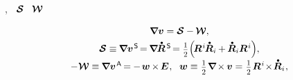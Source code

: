 \noindent {},  ~${\bm{\mathcal{S}}}$  ~${\vorticitytensor}$

\nopagebreak\begin{equation}
\begin{array}{c}
\boldnabla \bm{v} = \strainratetensor - \hspace{-0.1ex} \vorticitytensor
,
\\[.333em]
%
\strainratetensor \equiv \hspace{-0.12ex} \boldnabla {\bm{v}}^{\hspace{.2ex}\mathsf{S}} \hspace{-0.32ex}
=  \hspace{-0.2ex} \boldnabla \hspace{-0.16ex} \mathdotabove{\bm{R}}^{\hspace{.3ex}\mathsf{S}} \hspace{-0.32ex}
= \smalldisplaystyleonehalf \hspace{-0.33ex} \left( \hspace{-0.3ex} \bm{R}^{\hspace{.1ex}i} \hspace{-0.2ex} \mathdotabove{\bm{R}}_i \hspace{-0.1ex} + \hspace{-0.1ex} \mathdotabove{\bm{R}}_i \bm{R}^{\hspace{.1ex}i} \right)
\hspace{-0.44ex} ,
\\[.44em]
%
- \hspace{.1ex} \vorticitytensor \equiv \hspace{-0.12ex} \boldnabla {\bm{v}}^{\hspace{.2ex}\mathsf{A}} \hspace{-0.25ex}
= \hspace{-0.1ex} - \hspace{.24ex} \vorticityvector \hspace{-0.12ex} \times \hspace{-0.2ex} \bm{E}
\hspace{.1ex} , \hspace{.6em}
\vorticityvector \equiv \hspace{.1ex} \smalldisplaystyleonehalf \hspace{.15ex} \boldnabla \hspace{-0.2ex} \times \hspace{-0.1ex} \bm{v}
= \hspace{.1ex} \smalldisplaystyleonehalf \hspace{.15ex} \bm{R}^{\hspace{.1ex}i} \hspace{-0.4ex}\times\hspace{-0.35ex} \mathdotabove{\bm{R}}_i
\hspace{.1ex} ,
\end{array}
\end{equation}

